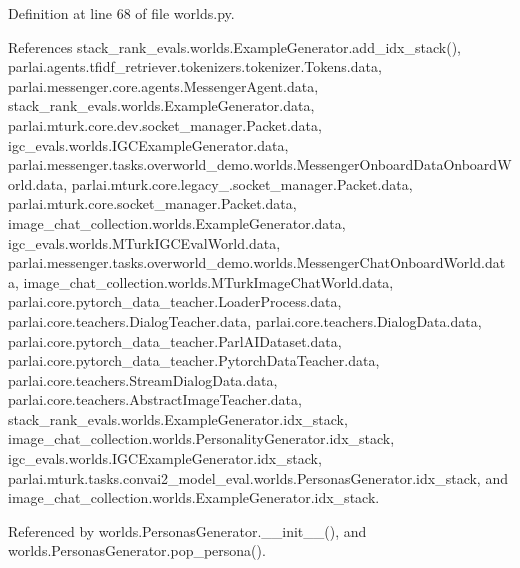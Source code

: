 Definition at line 68 of file worlds.\+py.



References stack\+\_\+rank\+\_\+evals.\+worlds.\+Example\+Generator.\+add\+\_\+idx\+\_\+stack(), parlai.\+agents.\+tfidf\+\_\+retriever.\+tokenizers.\+tokenizer.\+Tokens.\+data, parlai.\+messenger.\+core.\+agents.\+Messenger\+Agent.\+data, stack\+\_\+rank\+\_\+evals.\+worlds.\+Example\+Generator.\+data, parlai.\+mturk.\+core.\+dev.\+socket\+\_\+manager.\+Packet.\+data, igc\+\_\+evals.\+worlds.\+I\+G\+C\+Example\+Generator.\+data, parlai.\+messenger.\+tasks.\+overworld\+\_\+demo.\+worlds.\+Messenger\+Onboard\+Data\+Onboard\+World.\+data, parlai.\+mturk.\+core.\+legacy\+\_.\+socket\+\_\+manager.\+Packet.\+data, parlai.\+mturk.\+core.\+socket\+\_\+manager.\+Packet.\+data, image\+\_\+chat\+\_\+collection.\+worlds.\+Example\+Generator.\+data, igc\+\_\+evals.\+worlds.\+M\+Turk\+I\+G\+C\+Eval\+World.\+data, parlai.\+messenger.\+tasks.\+overworld\+\_\+demo.\+worlds.\+Messenger\+Chat\+Onboard\+World.\+data, image\+\_\+chat\+\_\+collection.\+worlds.\+M\+Turk\+Image\+Chat\+World.\+data, parlai.\+core.\+pytorch\+\_\+data\+\_\+teacher.\+Loader\+Process.\+data, parlai.\+core.\+teachers.\+Dialog\+Teacher.\+data, parlai.\+core.\+teachers.\+Dialog\+Data.\+data, parlai.\+core.\+pytorch\+\_\+data\+\_\+teacher.\+Parl\+A\+I\+Dataset.\+data, parlai.\+core.\+pytorch\+\_\+data\+\_\+teacher.\+Pytorch\+Data\+Teacher.\+data, parlai.\+core.\+teachers.\+Stream\+Dialog\+Data.\+data, parlai.\+core.\+teachers.\+Abstract\+Image\+Teacher.\+data, stack\+\_\+rank\+\_\+evals.\+worlds.\+Example\+Generator.\+idx\+\_\+stack, image\+\_\+chat\+\_\+collection.\+worlds.\+Personality\+Generator.\+idx\+\_\+stack, igc\+\_\+evals.\+worlds.\+I\+G\+C\+Example\+Generator.\+idx\+\_\+stack, parlai.\+mturk.\+tasks.\+convai2\+\_\+model\+\_\+eval.\+worlds.\+Personas\+Generator.\+idx\+\_\+stack, and image\+\_\+chat\+\_\+collection.\+worlds.\+Example\+Generator.\+idx\+\_\+stack.



Referenced by worlds.\+Personas\+Generator.\+\_\+\+\_\+init\+\_\+\+\_\+(), and worlds.\+Personas\+Generator.\+pop\+\_\+persona().


